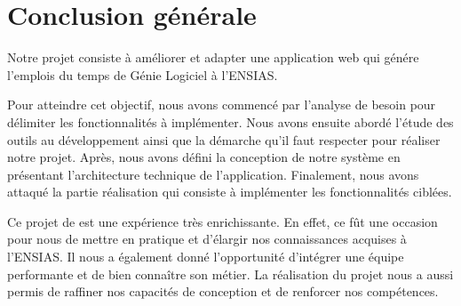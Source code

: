 \chapter*{Conclusion générale}
Notre projet consiste à améliorer et adapter une application web qui génére l'emplois du temps de Génie Logiciel à l'ENSIAS.


Pour atteindre cet objectif, nous avons commencé par l'analyse de besoin pour délimiter les fonctionnalités à implémenter. Nous avons ensuite abordé l'étude des outils au développement ainsi que la démarche qu'il faut respecter pour réaliser notre projet. Après, nous avons défini la conception de notre système en présentant l'architecture technique de l'application. Finalement, nous avons attaqué la partie réalisation qui consiste à implémenter les fonctionnalités ciblées.


Ce projet de est une expérience très enrichissante. En effet, ce fût une occasion pour nous de mettre en pratique et d'élargir nos connaissances acquises à l'ENSIAS. Il nous a également donné l'opportunité d'intégrer une équipe performante
et de bien connaître son métier. La réalisation du projet nous a aussi permis de raffiner nos capacités de conception et de renforcer nos compétences.

